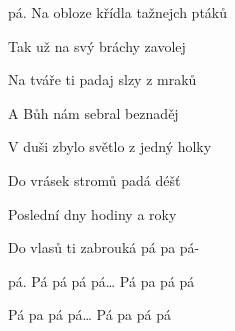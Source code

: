\begin{song}
\bigskip

pá. Na obloze křídla tažnejch ptáků \par
{} Tak už na svý bráchy zavolej \par
{} Na tváře ti padaj slzy z mraků \par
{} A Bůh nám sebral beznaděj \par

\bigskip

 V duši zbylo světlo z jedný holky \par
{} Do vrásek stromů padá déšť \par
{} Poslední dny hodiny a roky \par
{} Do vlasů ti zabrouká pá pa pá- \par

\bigskip

pá. Pá pá pá pá… Pá pa pá pá \par
{} Pá pa pá pá… Pá pa pá pá \par
{}   \par

\end{song}
